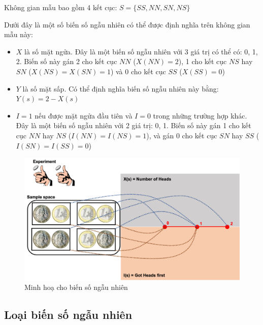 \documentclass[
]{book}
\begin{document}
Không gian mẫu bao gồm 4 kết cục: \(S = \{SS, NN, SN, NS\}\)

Dưới đây là một số biến số ngẫu nhiên có thể được định nghĩa trên không gian mẫu này:

\begin{itemize}
\item
  \(X\) là số mặt ngửa. Đây là một biến số ngẫu nhiên với 3 giá trị có thể có: 0, 1, 2. Biến số này gán 2 cho kết cục \(NN\) (\(X(NN) = 2\)), 1 cho kết cục \(NS\) hay \(SN\) (\(X(NS) = X(SN) = 1\)) và 0 cho kết cục \(SS\) (\(X(SS) = 0\))
\item
  \(Y\) là số mặt sấp. Có thể định nghĩa biến số ngẫu nhiên này bằng: \(Y(s) = 2 - X(s)\)
\item
  \(I = 1\) nếu được mặt ngửa đầu tiên và \(I = 0\) trong những trường hợp khác. Đây là một biến số ngẫu nhiên với 2 giá trị: 0, 1. Biến số này gán 1 cho kết cục \(NN\) hay \(NS\) (\(I(NN) = I(NS) = 1\)), và gán 0 cho kết cục \(SN\) hay \(SS\) (\(I(SN) = I(SS) = 0\))
\end{itemize}

\begin{figure}

{\centering \includegraphics[width=1\linewidth]{figures/Picture06} 

}

\caption{Minh hoạ cho biến số ngẫu nhiên}\label{fig:unnamed-chunk-2}
\end{figure}

\hypertarget{loux1ea1i-biux1ebfn-sux1ed1-ngux1eabu-nhiuxean}{%
\subsection{Loại biến số ngẫu nhiên}\label{loux1ea1i-biux1ebfn-sux1ed1-ngux1eabu-nhiuxean}}
\end{document}
